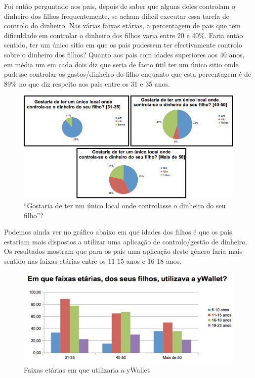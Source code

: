 \documentclass[12pt,a4paper]{article}
\begin{document}
      Foi então perguntado aos pais, depois de saber que alguns deles controlam o dinheiro dos filhos frequentemente, se acham dificil executar essa tarefa de controlo do dinheiro. Nas várias faixas etárias, a percentagem de pais que tem dificuldade em controlar o dinheiro dos filhos varia entre 20 e 40\%. Faria então sentido, ter um único sitio em que os pais pudessem ter efectivamente controlo sobre o dinheiro dos filhos? Quanto aos pais com idades superiores aos 40 anos, em média um em cada dois diz que seria de facto útil ter um único sitio onde pudesse controlar os gastos/dinheiro do filho enquanto que esta percentagem é de 89\% no que diz respeito aos pais entre os 31 e 35 anos.

      \begin{figure}[ht!]
        \centering
          \includegraphics[width=0.7\linewidth]{img/img9}
          \caption{``Gostaria de ter um único local onde controlasse o dinheiro do seu filho''?}
          \label{img9}
      \end{figure}

      Podemos ainda ver no gráfico abaixo em que idades dos filhos é que os pais estariam mais dispostos a utilizar uma aplicação de controlo/gestão de dinheiro. Os resultados mostram que para os pais uma aplicação deste género faria mais sentido nas faixas etárias entre os 11-15 anos e 16-18 anos. 

      \begin{figure}[ht!]
        \centering
          \includegraphics[width=0.7\linewidth]{img/img10}
          \caption{Faixas etárias em que utilizaria a yWallet}
          \label{img10}
      \end{figure}
\end{document}
